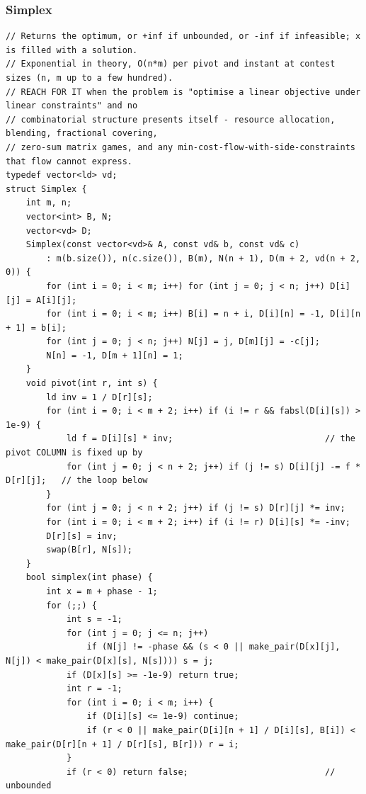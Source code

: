 \documentclass[9pt,a4paper,twocolumn]{extarticle}
\begin{document}
\subsubsection{Simplex}
\nopagebreak
\begin{lstlisting}
// Returns the optimum, or +inf if unbounded, or -inf if infeasible; x is filled with a solution.
// Exponential in theory, O(n*m) per pivot and instant at contest sizes (n, m up to a few hundred).
// REACH FOR IT when the problem is "optimise a linear objective under linear constraints" and no
// combinatorial structure presents itself - resource allocation, blending, fractional covering,
// zero-sum matrix games, and any min-cost-flow-with-side-constraints that flow cannot express.
typedef vector<ld> vd;
struct Simplex {
    int m, n;
    vector<int> B, N;
    vector<vd> D;
    Simplex(const vector<vd>& A, const vd& b, const vd& c)
        : m(b.size()), n(c.size()), B(m), N(n + 1), D(m + 2, vd(n + 2, 0)) {
        for (int i = 0; i < m; i++) for (int j = 0; j < n; j++) D[i][j] = A[i][j];
        for (int i = 0; i < m; i++) B[i] = n + i, D[i][n] = -1, D[i][n + 1] = b[i];
        for (int j = 0; j < n; j++) N[j] = j, D[m][j] = -c[j];
        N[n] = -1, D[m + 1][n] = 1;
    }
    void pivot(int r, int s) {
        ld inv = 1 / D[r][s];
        for (int i = 0; i < m + 2; i++) if (i != r && fabsl(D[i][s]) > 1e-9) {
            ld f = D[i][s] * inv;                              // the pivot COLUMN is fixed up by
            for (int j = 0; j < n + 2; j++) if (j != s) D[i][j] -= f * D[r][j];   // the loop below
        }
        for (int j = 0; j < n + 2; j++) if (j != s) D[r][j] *= inv;
        for (int i = 0; i < m + 2; i++) if (i != r) D[i][s] *= -inv;
        D[r][s] = inv;
        swap(B[r], N[s]);
    }
    bool simplex(int phase) {
        int x = m + phase - 1;
        for (;;) {
            int s = -1;
            for (int j = 0; j <= n; j++)
                if (N[j] != -phase && (s < 0 || make_pair(D[x][j], N[j]) < make_pair(D[x][s], N[s]))) s = j;
            if (D[x][s] >= -1e-9) return true;
            int r = -1;
            for (int i = 0; i < m; i++) {
                if (D[i][s] <= 1e-9) continue;
                if (r < 0 || make_pair(D[i][n + 1] / D[i][s], B[i]) < make_pair(D[r][n + 1] / D[r][s], B[r])) r = i;
            }
            if (r < 0) return false;                           // unbounded

\end{lstlisting}
\end{document}
